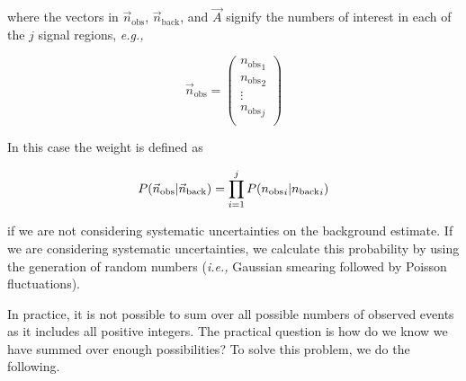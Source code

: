 where the vectors in $\vec{n}_\text{obs}$, $\vec{n}_\text{back}$, and
$\vec{A}$ signify the numbers of interest in each of the $j$ signal
regions, {\em e.g.,}

\begin{equation}
  \vec{n}_\text{obs} = \left(
  \begin{array}{c}
    {n_\text{obs}}_1\\
    {n_\text{obs}}_2\\
    \vdots\\
    {n_\text{obs}}_j\\
  \end{array}
  \right)
\end{equation}

In this case the weight is defined as

\begin{equation}
\label{eqn:backest}
P(\xobs|\vec{n}_\text{back}) = \prod^j_{i=1} P({n_\text{obs}}_i| {n_\text{back}}_i)
\end{equation}

if we are not considering systematic uncertainties on the background
estimate.  If we are considering systematic uncertainties, we
calculate this probability by using the generation of random numbers
({\em i.e.,} Gaussian smearing followed by Poisson fluctuations).




In practice, it is not possible to sum over all possible numbers of
observed events as it includes all positive integers.  The practical
question is how do we know we have summed over enough possibilities?
To solve this problem, we do the following.  

